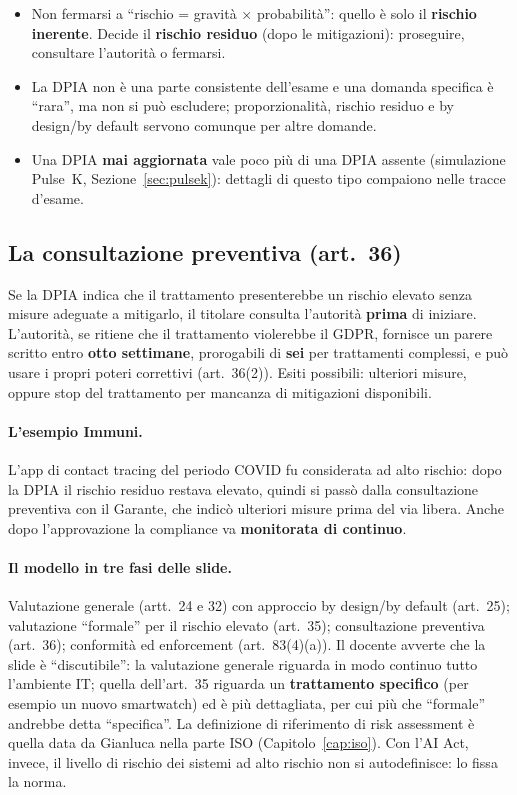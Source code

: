 \begin{esame}
\begin{itemize}
  \item Non fermarsi a ``rischio = gravità $\times$ probabilità'': quello è solo il \textbf{rischio
    inerente}. Decide il \textbf{rischio residuo} (dopo le mitigazioni): proseguire, consultare
    l'autorità o fermarsi.
  \item La DPIA non è una parte consistente dell'esame e una domanda specifica è ``rara'', ma non si può
    escludere; proporzionalità, rischio residuo e by design/by default servono comunque per altre
    domande.
  \item Una DPIA \textbf{mai aggiornata} vale poco più di una DPIA assente (simulazione Pulse~K,
    Sezione~\ref{sec:pulsek}): dettagli di questo tipo compaiono nelle tracce d'esame.
\end{itemize}
\end{esame}

\subsection{La consultazione preventiva (art.~36)}
Se la DPIA indica che il trattamento presenterebbe un rischio elevato senza misure adeguate a
mitigarlo, il titolare consulta l'autorità \textbf{prima} di iniziare. L'autorità, se ritiene che il
trattamento violerebbe il GDPR, fornisce un parere scritto entro \textbf{otto settimane}, prorogabili di
\textbf{sei} per trattamenti complessi, e può usare i propri poteri correttivi (art.~36(2)). Esiti
possibili: ulteriori misure, oppure stop del trattamento per mancanza di mitigazioni disponibili.

\paragraph{L'esempio Immuni.} L'app di contact tracing del periodo COVID fu considerata ad alto rischio:
dopo la DPIA il rischio residuo restava elevato, quindi si passò dalla consultazione preventiva con il
Garante, che indicò ulteriori misure prima del via libera. Anche dopo l'approvazione la compliance va
\textbf{monitorata di continuo}.

\paragraph{Il modello in tre fasi delle slide.} Valutazione generale (artt.~24 e 32) con approccio by
design/by default (art.~25); valutazione ``formale'' per il rischio elevato (art.~35); consultazione
preventiva (art.~36); conformità ed enforcement (art.~83(4)(a)). Il docente avverte che la slide è
``discutibile'': la valutazione generale riguarda in modo continuo tutto l'ambiente IT; quella
dell'art.~35 riguarda un \textbf{trattamento specifico} (per esempio un nuovo smartwatch) ed è più
dettagliata, per cui più che ``formale'' andrebbe detta ``specifica''. La definizione di riferimento di
risk assessment è quella data da Gianluca nella parte ISO (Capitolo~\ref{cap:iso}). Con l'AI Act,
invece, il livello di rischio dei sistemi ad alto rischio non si autodefinisce: lo fissa la norma.

